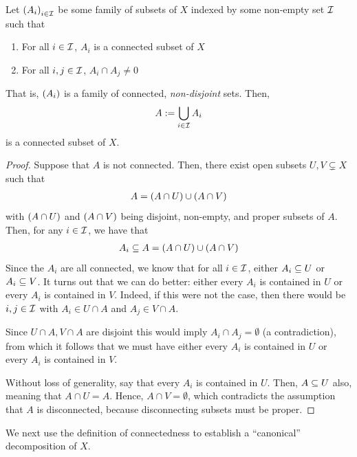 \begin{boxlemma}
    Let $\left( A_i \right)_{i \in \mathcal{I}}$ be some family of subsets of $X$ indexed by some non-empty set $\mathcal{I}$ such that
    \begin{enumerate}
        \item For all $i \in \mathcal{I}$, $A_i$ is a connected subset of $X$
        \item For all $i, j \in \mathcal{I}$, $A_i \cap A_j \neq 0$
    \end{enumerate}
    That is, $\left( A_i \right)$ is a family of connected, \textit{non-disjoint} sets. Then,
    \begin{align*}
        A := \bigcup_{i \in \mathcal{I}} A_i
    \end{align*}
    is a connected subset of $X$.
\end{boxlemma}
\begin{proof}
    Suppose that $A$ is not connected. Then, there exist open subsets $U, V \subsetneq X$ such that
    \begin{align*}
        A = \left( A \cap U \right) \cup \left( A \cap V \right)
    \end{align*}
    with $\left( A \cap U \right)$ and $\left( A \cap V \right)$ being disjoint, non-empty, and proper subsets of $A$. Then, for any $i \in \mathcal{I}$, we have that
    \begin{align*}
        A_i \subseteq A = \left( A \cap U \right) \cup \left( A \cap V \right)
    \end{align*}
    Since the $A_i$ are all connected, we know that for all $i \in \mathcal{I}$, either $A_i \subseteq U$ or $A_i \subseteq V$. It turns out that we can do better: either every $A_i$ is contained in $U$ or every $A_i$ is contained in $V$. Indeed, if this were not the case, then there would be $i, j \in \mathcal{I}$ with $A_i \in U\cap A$ and $A_j \in V\cap A$. 
    
    Since $U\cap A, V\cap A$ are disjoint this would imply $A_i\cap A_j=\emptyset$ (a contradiction), from which it follows that we must have either every $A_i$ is contained in $U$ or every $A_i$ is contained in $V$.

    Without loss of generality, say that every $A_i$ is contained in $U$. Then, $A \subseteq U$ also, meaning that $A \cap U = A$. Hence, $A \cap V = \emptyset$, which contradicts the assumption that $A$ is disconnected, because disconnecting subsets must be proper.
\end{proof}

 We next use the definition of connectedness to establish a ``canonical'' decomposition of $X$.

